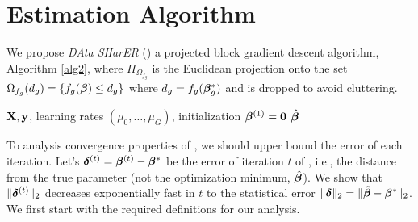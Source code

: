 
\section{Estimation Algorithm}
\label{sec:opt}
We propose \emph{DAta SHarER} (\dc) a projected block gradient descent algorithm, Algorithm \ref{alg2}, where $\Pi_{\Omega_{f_g}}$ is the Euclidean projection onto the set $\Omega_{f_g}(d_g) = \{f_g(\boldsymbol{\beta}) \leq d_g\}$ where $d_g = f_g(\boldsymbol{\beta}_g^*)$ and is dropped to avoid cluttering. %

\begin{algorithm}[t]
	\caption{  \dc }
	\label{alg2}
	\begin{algorithmic}[1]
		 $\mathbf{X}, \mathbf{y}$, learning rates $(\mu_0, \dots, \mu_G)$, initialization $\boldsymbol{\beta} ^{(1)} = \mathbf{0}$
		 $\hat{\boldsymbol{\beta}}$
		\ENDFOR
		\ENDFOR
	\end{algorithmic}
\end{algorithm}

To analysis convergence properties of \dc, we should upper bound the error of each iteration.
Let's $\boldsymbol{\delta}^{(t)} = \boldsymbol{\beta}^{(t)} - \boldsymbol{\beta}^*$ be the error of  iteration $t$ of \dc, i.e., the distance from the true parameter (not the optimization minimum, $\hat{\boldsymbol{\beta}}$). We show that $\|\boldsymbol{\delta}^{(t)}\|_{2}$ decreases exponentially fast in $t$ to the statistical error $\|\boldsymbol{\delta}\|_{2} = \|\hat{\boldsymbol{\beta}} - \boldsymbol{\beta}^*\|_{2}$. We first start with the required definitions for our analysis.

